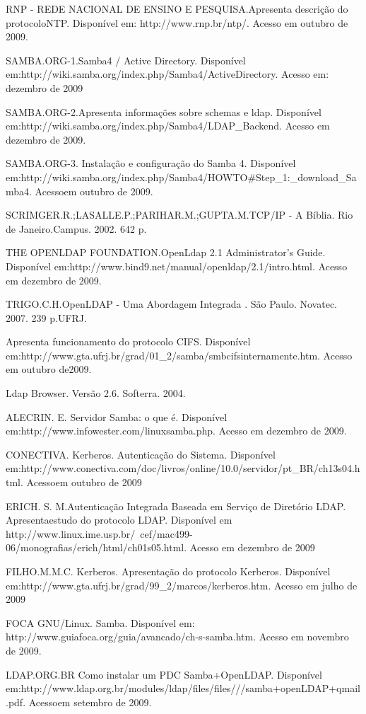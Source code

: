 RNP - REDE NACIONAL DE ENSINO E PESQUISA.Apresenta descrição do protocoloNTP. Disponível em: http://www.rnp.br/ntp/. Acesso em outubro de 2009.

SAMBA.ORG-1.Samba4 / Active Directory. Disponível em:http://wiki.samba.org/index.php/Samba4/ActiveDirectory. Acesso em: dezembro de 2009

SAMBA.ORG-2.Apresenta informações sobre schemas e ldap. Disponível em:http://wiki.samba.org/index.php/Samba4/LDAP\_Backend. Acesso em dezembro de 2009.

SAMBA.ORG-3. Instalação e configuração do Samba 4. Disponível em:http://wiki.samba.org/index.php/Samba4/HOWTO\#Step\_1:\_download\_Samba4. Acessoem outubro de 
2009.

SCRIMGER.R.;LASALLE.P.;PARIHAR.M.;GUPTA.M.TCP/IP - A Bíblia. Rio de Janeiro.Campus. 2002. 642 p.

THE OPENLDAP FOUNDATION.OpenLdap 2.1 Administrator's Guide. Disponível em:http://www.bind9.net/manual/openldap/2.1/intro.html. Acesso em dezembro de 2009.

TRIGO.C.H.OpenLDAP - Uma Abordagem Integrada
. São Paulo. Novatec. 2007. 239 p.UFRJ.

Apresenta funcionamento do protocolo CIFS. Disponível em:http://www.gta.ufrj.br/grad/01\_2/samba/smbcifsinternamente.htm. Acesso em outubro de2009.

Ldap Browser. Versão 2.6. Softerra. 2004.

ALECRIN. E. Servidor Samba: o que é. Disponível em:http://www.infowester.com/linuxsamba.php. Acesso em dezembro de 2009.

CONECTIVA. Kerberos. Autenticação do Sistema. Disponível em:http://www.conectiva.com/doc/livros/online/10.0/servidor/pt\_BR/ch13s04.html. Acessoem outubro de 2009

ERICH. S. M.Autenticação Integrada Baseada em Serviço de Diretório LDAP. Apresentaestudo do protocolo LDAP. Disponível em http://www.linux.ime.usp.br/~cef/mac499-06/monografias/erich/html/ch01s05.html. Acesso em dezembro de 2009

FILHO.M.M.C. Kerberos. Apresentação do protocolo Kerberos. Disponível em:http://www.gta.ufrj.br/grad/99\_2/marcos/kerberos.htm. Acesso em julho de 2009

FOCA GNU/Linux. Samba. Disponível em: http://www.guiafoca.org/guia/avancado/ch-s-samba.htm. Acesso em novembro de 2009.

LDAP.ORG.BR Como instalar um PDC Samba+OpenLDAP. Disponível em:http://www.ldap.org.br/modules/ldap/files/files///samba+openLDAP+qmail.pdf. Acessoem setembro de 2009.

